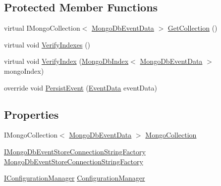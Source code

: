 \subsection*{Protected Member Functions}
\begin{DoxyCompactItemize}
\item 
virtual I\+Mongo\+Collection$<$ \hyperlink{classCqrs_1_1MongoDB_1_1Events_1_1MongoDbEventData}{Mongo\+Db\+Event\+Data} $>$ \hyperlink{classCqrs_1_1MongoDB_1_1Events_1_1MongoDbEventStore_aa6a9499aa1dcde55d82d8e0f3b5bd077_aa6a9499aa1dcde55d82d8e0f3b5bd077}{Get\+Collection} ()
\item 
virtual void \hyperlink{classCqrs_1_1MongoDB_1_1Events_1_1MongoDbEventStore_a60ae02928a3ae8cb99d46f6c340b5138_a60ae02928a3ae8cb99d46f6c340b5138}{Verify\+Indexes} ()
\item 
virtual void \hyperlink{classCqrs_1_1MongoDB_1_1Events_1_1MongoDbEventStore_a6a6f0303cd412974d90be87d281e81f5_a6a6f0303cd412974d90be87d281e81f5}{Verify\+Index} (\hyperlink{classCqrs_1_1MongoDB_1_1DataStores_1_1Indexes_1_1MongoDbIndex}{Mongo\+Db\+Index}$<$ \hyperlink{classCqrs_1_1MongoDB_1_1Events_1_1MongoDbEventData}{Mongo\+Db\+Event\+Data} $>$ mongo\+Index)
\item 
override void \hyperlink{classCqrs_1_1MongoDB_1_1Events_1_1MongoDbEventStore_a13f6823671d7cb9c042d8f7156a51b89_a13f6823671d7cb9c042d8f7156a51b89}{Persist\+Event} (\hyperlink{classCqrs_1_1Events_1_1EventData}{Event\+Data} event\+Data)
\end{DoxyCompactItemize}
\subsection*{Properties}
\begin{DoxyCompactItemize}
\item 
I\+Mongo\+Collection$<$ \hyperlink{classCqrs_1_1MongoDB_1_1Events_1_1MongoDbEventData}{Mongo\+Db\+Event\+Data} $>$ \hyperlink{classCqrs_1_1MongoDB_1_1Events_1_1MongoDbEventStore_af2dfb3af9b76e8b1cab0f7dc68cdc377_af2dfb3af9b76e8b1cab0f7dc68cdc377}{Mongo\+Collection}
\item 
\hyperlink{interfaceCqrs_1_1MongoDB_1_1Events_1_1IMongoDbEventStoreConnectionStringFactory}{I\+Mongo\+Db\+Event\+Store\+Connection\+String\+Factory} \hyperlink{classCqrs_1_1MongoDB_1_1Events_1_1MongoDbEventStore_aa008df8aa5d4e63a2123735acb7cd775_aa008df8aa5d4e63a2123735acb7cd775}{Mongo\+Db\+Event\+Store\+Connection\+String\+Factory}
\item 
\hyperlink{interfaceCqrs_1_1Configuration_1_1IConfigurationManager}{I\+Configuration\+Manager} \hyperlink{classCqrs_1_1MongoDB_1_1Events_1_1MongoDbEventStore_a2944d6e589401531ba4283b984140c0e_a2944d6e589401531ba4283b984140c0e}{Configuration\+Manager}
\end{DoxyCompactItemize}
